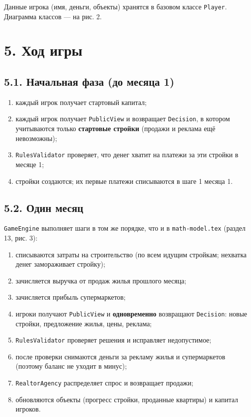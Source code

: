 \documentclass[
]{article}
\providecommand{\tightlist}{%
  \setlength{\itemsep}{0pt}\setlength{\parskip}{0pt}}
\begin{document}
Данные игрока (имя, деньги, объекты) хранятся в базовом классе
\texttt{Player}. Диаграмма классов --- на рис. 2.

\section{5. Ход игры}\label{ux445ux43eux434-ux438ux433ux440ux44b}

\subsection{5.1. Начальная фаза (до месяца
1)}\label{ux43dux430ux447ux430ux43bux44cux43dux430ux44f-ux444ux430ux437ux430-ux434ux43e-ux43cux435ux441ux44fux446ux430-1}

\begin{enumerate}
\def\labelenumi{\arabic{enumi}.}
\tightlist
\item
  каждый игрок получает стартовый капитал;
\item
  каждый игрок получает \texttt{PublicView} и возвращает
  \texttt{Decision}, в котором учитываются только \textbf{стартовые
  стройки} (продажи и реклама ещё невозможны);
\item
  \texttt{RulesValidator} проверяет, что денег хватит на платежи за эти
  стройки в месяце 1;
\item
  стройки создаются; их первые платежи списываются в шаге 1 месяца 1.
\end{enumerate}

\subsection{5.2. Один
месяц}\label{ux43eux434ux438ux43d-ux43cux435ux441ux44fux446}

\texttt{GameEngine} выполняет шаги в том же порядке, что и в
\texttt{math-model.tex} (раздел 13, рис. 3):

\begin{enumerate}
\def\labelenumi{\arabic{enumi}.}
\tightlist
\item
  списываются затраты на строительство (по всем идущим стройкам;
  нехватка денег замораживает стройку);
\item
  зачисляется выручка от продаж жилья прошлого месяца;
\item
  зачисляется прибыль супермаркетов;
\item
  игроки получают \texttt{PublicView} и \textbf{одновременно} возвращают
  \texttt{Decision}: новые стройки, предложение жилья, цены, реклама;
\item
  \texttt{RulesValidator} проверяет решения и исправляет недопустимое;
\item
  после проверки снимаются деньги за рекламу жилья и супермаркетов
  (поэтому баланс не уходит в минус);
\item
  \texttt{RealtorAgency} распределяет спрос и возвращает продажи;
\item
  обновляются объекты (прогресс стройки, проданные квартиры) и капитал
  игроков.
\end{enumerate}
\end{document}
